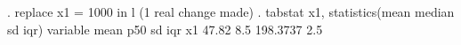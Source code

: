 . replace x1 = 1000 in l
(1 real change made)
{\smallskip}
. tabstat x1, statistics(mean median sd iqr)
{\smallskip}
    variable {\VBAR}      mean       p50        sd       iqr
          x1 {\VBAR}     47.82       8.5  198.3737       2.5
{\smallskip}
